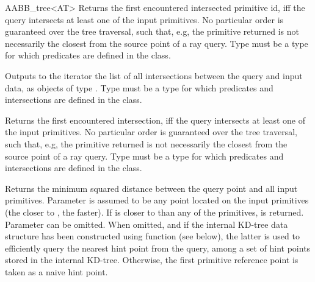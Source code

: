 \begin{ccRefClass}{AABB_tree<AT>}
{Returns the first encountered intersected primitive id, iff the query intersects at least one of the input primitives. No particular order is guaranteed over the tree traversal, such that, e.g, the primitive returned is not necessarily the closest from the source point of a ray query. Type  must be a type for which  predicates are defined in the  class.}


	
{Outputs to the iterator the list of all intersections between the query and input data, as objects of type . Type  must be a type for which  predicates and intersections are defined in the  class.}

{Returns the first encountered intersection, iff the query intersects at least one of the input primitives. No particular order is guaranteed over the tree traversal, such that, e.g, the primitive returned is not necessarily the closest from the source point of a ray query. Type  must be a type for which  predicates and intersections are defined in the  class.}




{Returns the minimum squared distance between the query point and all input primitives. Parameter  is assumed to be any point located on the input primitives (the closer  to , the faster). If  is closer to  than any of the primitives,  is returned. Parameter  can be omitted. When omitted, and if the internal KD-tree data structure has been constructed using function  (see below), the latter is used to efficiently query the nearest hint point from the query, among a set of hint points stored in the internal KD-tree. Otherwise, the first primitive reference point is taken as a naive hint point. }


\end{ccRefClass}
